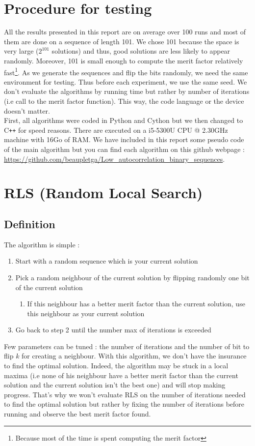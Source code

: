 \documentclass[a4paper,11pt,openany]{article}
\begin{document}
\section{Procedure for testing}
\noindent
All the results presented in this report are on average over 100 runs and most of them are done on a sequence of length 101. We chose 101 because the space is very large ($2^{101}$ solutions) and thus, good solutions are less likely to appear randomly. Moreover, 101 is small enough to compute the merit factor relatively fast\footnote{Because most of the time is spent computing the merit factor}. As we generate the sequences and flip the bits randomly, we need the same environment for testing. Thus before each experiment, we use the same seed. We don't evaluate the algorithms by running time but rather by number of iterations (i.e call to the merit factor function). This way, the code language or the device doesn't matter.\\
First, all algorithms were coded in Python and Cython but we then changed to C\texttt{++} for speed reasons. There are executed on a i5-5300U CPU @ 2.30GHz machine with 16Go of RAM. We have included in this report some pseudo code of the main algorithm but you can find each algorithm on this github webpage : \url{https://github.com/beaupletga/Low_autocorrelation_binary_sequences}.
\section{RLS (Random Local Search)}
\subsection{Definition}
\noindent
The algorithm is simple \cite{rls}:
\begin{enumerate}
\item Start with a random sequence which is your current solution
\item Pick a random neighbour of the current solution by flipping randomly one bit of the current solution
\begin{enumerate}
\item If this neighbour has a better merit factor than the current solution, use this neighbour as your current solution
\end{enumerate}
\item Go back to step 2 until the number max of iterations is exceeded
\end{enumerate}
Few parameters can be tuned : the number of iterations and the number of bit to flip $k$ for creating a neighbour. With this algorithm, we don't have the insurance to find the optimal solution. Indeed, the algorithm may be stuck in a local maxima (i.e none of his neighbour have a better merit factor than the current solution and the current solution isn't the best one) and will stop making progress. That's why we won't evaluate RLS on the number of iterations needed to find the optimal solution but rather by fixing the number of iterations before running and observe the best merit factor found.
\end{document}
